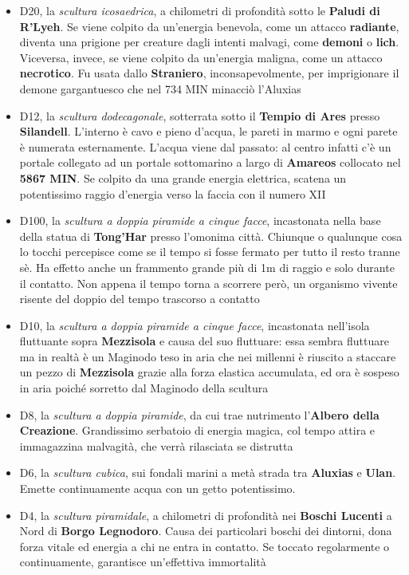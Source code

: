 \documentclass[10pt,twoside,onecolumn,openany]{book}
\begin{document}
\begin{multicols}{2}
\begin{itemize}
	\item D20, la \textit{scultura icosaedrica}, a chilometri di profondità sotto le \textbf{Paludi di R'Lyeh}. Se viene colpito da un'energia benevola, come un attacco \textbf{radiante}, diventa una prigione per creature dagli intenti malvagi, come \textbf{demoni} o \textbf{lich}. Viceversa, invece, se viene colpito da un'energia maligna, come un attacco \textbf{necrotico}. Fu usata dallo \textbf{Straniero}, inconsapevolmente, per imprigionare il demone gargantuesco che nel 734 MIN minacciò l'Aluxias
	\item D12, la \textit{scultura dodecagonale}, sotterrata sotto il \textbf{Tempio di Ares} presso \textbf{Silandell}. L'interno è cavo e pieno d'acqua, le pareti in marmo e ogni parete è numerata esternamente. L'acqua viene dal passato: al centro infatti c'è un portale collegato ad un portale sottomarino a largo di \textbf{Amareos} collocato nel \textbf{5867 MIN}. Se colpito da una grande energia elettrica, scatena un potentissimo raggio d'energia verso la faccia con il numero XII
	\item D100, la \textit{scultura a doppia piramide a cinque facce}, incastonata nella base della statua di \textbf{Tong'Har} presso l'omonima città. Chiunque o qualunque cosa lo tocchi percepisce come se il tempo si fosse fermato per tutto il resto tranne sè. Ha effetto anche un frammento grande più di 1m di raggio e solo durante il contatto. Non appena il tempo torna a scorrere però, un organismo vivente risente del doppio del tempo trascorso a contatto
	\item D10, la \textit{scultura a doppia piramide a cinque facce}, incastonata nell'isola fluttuante sopra \textbf{Mezzisola} e causa del suo fluttuare: essa sembra fluttuare ma in realtà è un Maginodo teso in aria che nei millenni è riuscito a staccare un pezzo di \textbf{Mezzisola} grazie alla forza elastica accumulata, ed ora è sospeso in aria poiché sorretto dal Maginodo della scultura
	\item D8, la \textit{scultura a doppia piramide}, da cui trae nutrimento l'\textbf{Albero della Creazione}. Grandissimo serbatoio di energia magica, col tempo attira e immagazzina malvagità, che verrà rilasciata se distrutta
	\item D6, la \textit{scultura cubica}, sui fondali marini a metà strada tra \textbf{Aluxias} e \textbf{Ulan}. Emette continuamente acqua con un getto potentissimo.
	\item D4, la \textit{scultura piramidale}, a chilometri di profondità nei \textbf{Boschi Lucenti} a Nord di \textbf{Borgo Legnodoro}. Causa dei particolari boschi dei dintorni, dona forza vitale ed energia a chi ne entra in contatto. Se toccato regolarmente o continuamente, garantisce un'effettiva immortalità\\
\end{itemize}
\end{multicols}
\end{document}

